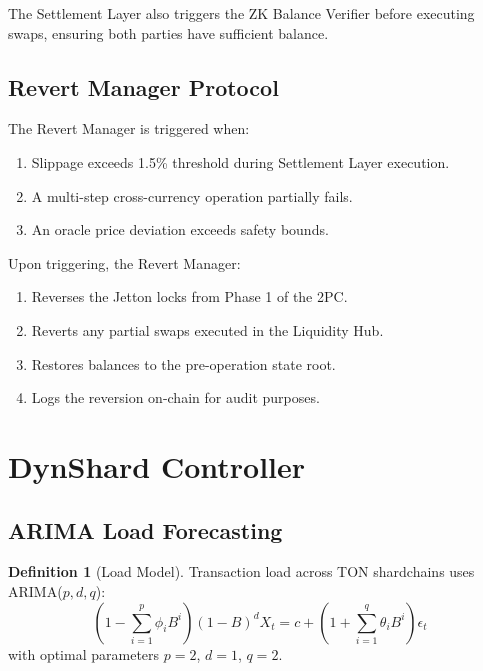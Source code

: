 \documentclass[12pt,a4paper]{article}
\theoremstyle{definition}
\newtheorem{definition}{Definition}[section]
\theoremstyle{remark}
\begin{document}
The Settlement Layer also triggers the ZK Balance Verifier before executing swaps, ensuring both parties have sufficient balance.

\subsection{Revert Manager Protocol}

The Revert Manager is triggered when:
\begin{enumerate}[nosep]
    \item Slippage exceeds 1.5\% threshold during Settlement Layer execution.
    \item A multi-step cross-currency operation partially fails.
    \item An oracle price deviation exceeds safety bounds.
\end{enumerate}

Upon triggering, the Revert Manager:
\begin{enumerate}[nosep]
    \item Reverses the Jetton locks from Phase 1 of the 2PC.
    \item Reverts any partial swaps executed in the Liquidity Hub.
    \item Restores balances to the pre-operation state root.
    \item Logs the reversion on-chain for audit purposes.
\end{enumerate}


\section{DynShard Controller}
\label{sec:dynshard}

\subsection{ARIMA Load Forecasting}

\begin{definition}[Load Model]
Transaction load across TON shardchains uses ARIMA($p,d,q$):
\begin{equation}
\left(1 - \sum_{i=1}^{p} \phi_i B^i\right)(1-B)^d X_t = c + \left(1 + \sum_{i=1}^{q} \theta_i B^i\right)\epsilon_t
\end{equation}
with optimal parameters $p = 2$, $d = 1$, $q = 2$.
\end{definition}
\end{document}
